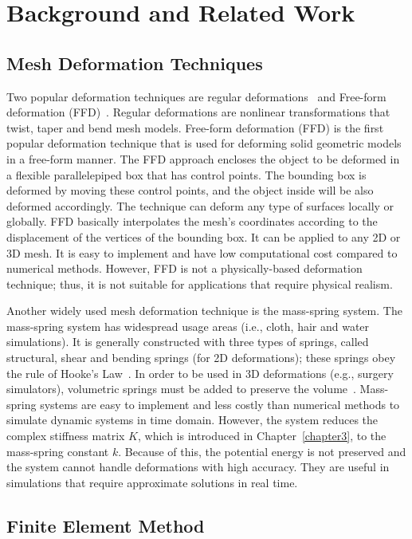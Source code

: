 \chapter{Background and Related Work}
\label{chapter2}

\section{Mesh Deformation Techniques}

Two popular deformation techniques are regular deformations~\cite{Barr84} and Free-form deformation (FFD)~\cite{Sederberg86}. Regular deformations are nonlinear transformations that twist, taper and bend mesh models. Free-form deformation (FFD) is the first popular deformation technique that is used for deforming solid geometric models in a free-form manner. The FFD approach encloses the object to be deformed in a flexible parallelepiped box that has control points. The bounding box is deformed by moving these control points, and the object inside will be also deformed accordingly. The technique can deform any type of surfaces locally or globally. FFD basically interpolates the mesh's coordinates according to the displacement of the vertices of the bounding box. It can be applied to any 2D or 3D mesh. It is easy to implement and have low computational cost compared to numerical methods. However, FFD is not a physically-based deformation technique; thus, it is not suitable for applications that require physical realism.

Another widely used mesh deformation technique is the mass-spring system. The mass-spring system has widespread usage areas (i.e., cloth, hair and water simulations). It is generally constructed with three types of springs, called structural, shear and bending springs (for 2D deformations); these springs obey the rule of Hooke's Law~\cite{Provot95,Lender99}. In order to be used in 3D deformations (e.g., surgery simulators), volumetric springs must be added to preserve the volume~\cite{Wang06}. Mass-spring systems are easy to implement and less costly than numerical methods to simulate dynamic systems in time domain. However, the system reduces the complex stiffness matrix $K$, which is introduced in Chapter~\ref{chapter3}, to the mass-spring constant $k$. Because of this, the potential energy is not preserved and the system cannot handle deformations with high accuracy. They are useful in simulations that require approximate solutions in real time.

\section{Finite Element Method}

